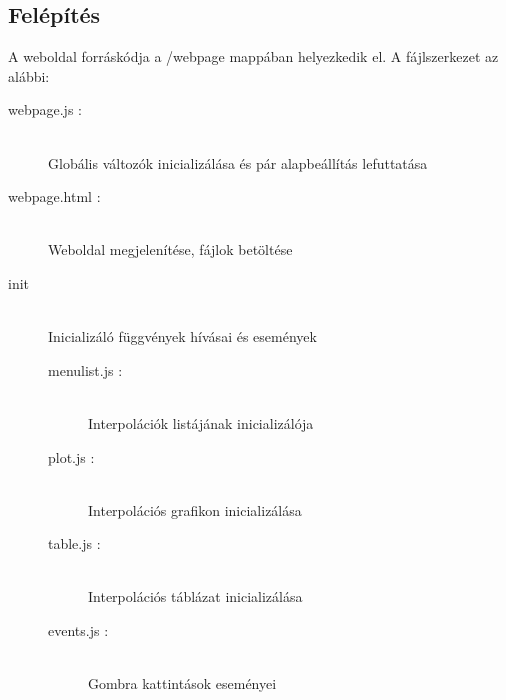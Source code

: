 \subsection{Felépítés}
	A weboldal forráskódja a /webpage mappában helyezkedik el. 
	A fájlszerkezet az alábbi:
	\begin{description}
		\item[webpage.js :] \hfill \\  
		Globális változók inicializálása és pár alapbeállítás lefuttatása
		
		\item[webpage.html :]  \hfill \\ 
		Weboldal megjelenítése, fájlok betöltése
		
		\item[init] \hfill \\ 
		Inicializáló függvények hívásai és események
		\begin{description}
			\item[menulist.js : ] \hfill \\ 
				Interpolációk listájának inicializálója
		  	\item[plot.js : ] \hfill \\ 
		  		Interpolációs grafikon inicializálása
			\item[table.js : ] \hfill \\ 
				Interpolációs táblázat inicializálása
		 	\item[events.js : ] \hfill \\ 
		 		Gombra kattintások eseményei
		\end{description}


\end{description}
